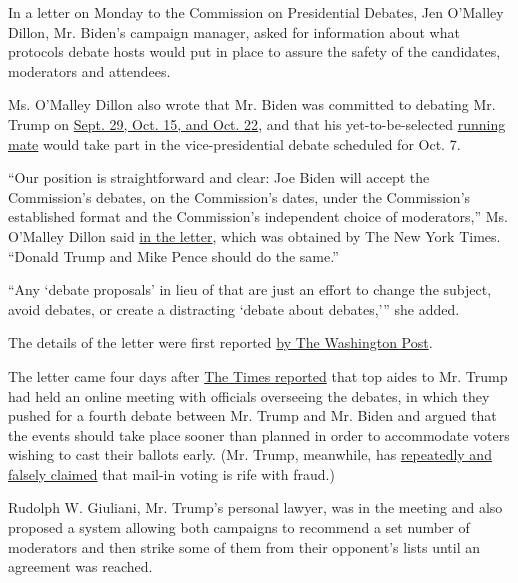 In a letter on Monday to the Commission on Presidential Debates, Jen
O'Malley Dillon, Mr. Biden's campaign manager, asked for information
about what protocols debate hosts would put in place to assure the
safety of the candidates, moderators and attendees.

Ms. O'Malley Dillon also wrote that Mr. Biden was committed to debating
Mr. Trump on
\href{https://www.nytimes.com/interactive/2019/us/elections/2020-presidential-election-calendar.html}{Sept.
29, Oct. 15, and Oct. 22}, and that his yet-to-be-selected
\href{https://www.nytimes.com/article/biden-vice-president-2020.html}{running
mate} would take part in the vice-presidential debate scheduled for Oct.
7.

``Our position is straightforward and clear: Joe Biden will accept the
Commission's debates, on the Commission's dates, under the Commission's
established format and the Commission's independent choice of
moderators,'' Ms. O'Malley Dillon said
\href{https://int.nyt.com/data/documenthelper/7038-biden-letter-to-debate-commission/94c02d45d35cdd5b9865/optimized/full.pdf\#page=1}{in
the letter}, which was obtained by The New York Times. ``Donald Trump
and Mike Pence should do the same.''

``Any `debate proposals' in lieu of that are just an effort to change
the subject, avoid debates, or create a distracting `debate about
debates,''' she added.

The details of the letter were first reported
\href{https://www.washingtonpost.com/politics/biden-campaign-confirms-he-will-attend-three-debates-with-trump-criticizes-the-president-for-flipping-on-his-debate-stance/2020/06/22/b48be3a0-b49a-11ea-a510-55bf26485c93_story.html}{by
The Washington Post}.

The letter came four days after
\href{https://www.nytimes.com/2020/06/18/us/politics/trump-presidential-debates-2020.html}{The
Times reported} that top aides to Mr. Trump had held an online meeting
with officials overseeing the debates, in which they pushed for a fourth
debate between Mr. Trump and Mr. Biden and argued that the events should
take place sooner than planned in order to accommodate voters wishing to
cast their ballots early. (Mr. Trump, meanwhile, has
\href{https://www.nytimes.com/2020/06/02/us/politics/republicans-mail-voting-trump.html}{repeatedly
and falsely claimed} that mail-in voting is rife with fraud.)

Rudolph W. Giuliani, Mr. Trump's personal lawyer, was in the meeting and
also proposed a system allowing both campaigns to recommend a set number
of moderators and then strike some of them from their opponent's lists
until an agreement was reached.

